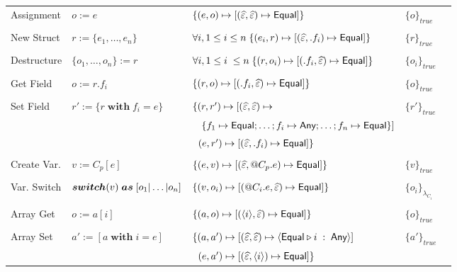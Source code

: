 \documentclass[11pt]{article}
\newcommand{\recordnew}{r := \{e_1, \ldots, e_n \}}
\newcommand{\recordall}{\{o_1, \ldots, o_n \} := r}
\newcommand{\recordset}{r' := \{r\; \boldsymbol{with}\; f_i = e \} }
\newcommand{\recordget}{o := r.f_i}
\newcommand{\varcons}{v := C_p[e]}
\newcommand{\varswitch}
{\boldsymbol{switch}(v) \;\boldsymbol{as} \;[o_1 \arrowvert \ldots \arrowvert o_n ]}
\newcommand{\arrayget}{o := a[i]}
\newcommand{\arrayset}{a' := [a \; \boldsymbol{with} \; i = e]}
\begin{document}
\begin{table*}[hbtp]
\begin{minipage}{\textwidth}
\begin{tabular}{*{5}{l}}
    \textsf{Assignment} &$o:=e$  &$\{ (e, o) \mapsto [(\widehat{\varepsilon}, \widehat{\varepsilon}) \mapsto \textsf{Equal}] \}$   
    & $\{o\}_{\mathit{true}}$  \\\\

    \textsf{New Struct}&$\recordnew$ &$\forall i, 1\leq i \leq n \; \{(e_i, r) \mapsto [(\widehat{\varepsilon}, .f_i) \mapsto \textsf{Equal}]\}$ &$\{r\}_{\mathit{true}}$ \\\\

    \textsf{Destructure} &$\recordall$ &$\forall i, 1\leq i \; \leq n \; \{(r, o_i) \mapsto [(.f_i, \widehat{\varepsilon}) \mapsto \textsf{Equal}]\}$ &$\{o_i\}_{\mathit{true}}$ \\\\

    \textsf{Get Field} & $\recordget$ & $\{ (r, o) \mapsto [(.f_i, \widehat{\varepsilon}) \mapsto \textsf{Equal}] \}$ &$\{o\}_{\mathit{true}}$ \\\\

    \textsf{Set Field} &$\recordset$  & 
      $\{ (r, r') \mapsto [(\widehat{\varepsilon}, \widehat{\varepsilon}) \mapsto $ & $\{r'\}_{\mathit{true}}$ \\
      & & $\,\,\;\;\{f_1 \mapsto \textsf{Equal}; \ldots; f_i \mapsto \textsf{Any}; \ldots; f_n \mapsto \textsf{Equal}\}]$ &\\
      & & $\;\;(e, r') \mapsto [(\widehat{\varepsilon}, .f_i) \mapsto \textsf{Equal}]\}$ & \\\\
   
    \textsf{Create Var.} & $\varcons$ &  
      $\{(e, v) \mapsto [(\widehat{\varepsilon}, @C_p.e) \mapsto \textsf{Equal}]\}$ 
      & $\{v\}_{\mathit{true}}$ \\\\

    \textsf{Var. Switch} & $\varswitch$ & 
      $\{(v, o_i) \mapsto [(@C_i.e, \widehat{\varepsilon}) \mapsto \textsf{Equal}]\} $
      & $\{o_i\}_{\lambda_{C_i}}$ \\\\
  
    \textsf{Array Get} & $\arrayget$  & $\{(a, o) \mapsto [(\langle i \rangle, \widehat{\varepsilon}) \mapsto \textsf{Equal}] \}$ &$\{o\}_{\mathit{true}}$ \\\\
   
    \textsf{Array Set} & $\arrayset$ &  
      $\{ (a, a') \mapsto [(\widehat{\varepsilon}, \widehat{\varepsilon}) \mapsto \langle \textsf{Equal} \triangleright i \;: \; \textsf{Any} \rangle]$
      & $\{a'\}_{\mathit{true}}$ \\
      &&$\;\; (e, a') \mapsto [(\widehat{\varepsilon}, \langle i \rangle) \mapsto \textsf{Equal} ]\}$&\\ 

    \bottomrule
  \end{tabular}
\end{minipage}

\end{table*}
\end{document}

